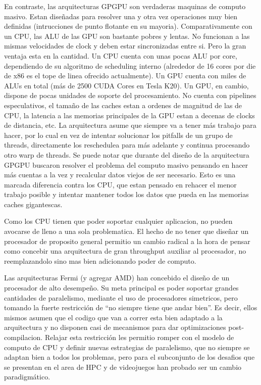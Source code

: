 En contraste, las arquitecturas GPGPU son verdaderas maquinas de computo masivo. Estan dise\~nadas para
resolver una y otra vez operaciones muy bien definidas (intrucciones de punto flotante en su mayoria).
Comparativamente con un CPU, las ALU de las GPU son bastante pobres y lentas. No funcionan a las mismas
velocidades de clock y deben estar sincronizadas entre si. Pero la gran ventaja esta en la cantidad.
Un CPU cuenta con unas pocas ALU por core, dependiendo de su algoritmo de scheduling interno
(alrededor de 16 cores por die de x86 es el tope de linea ofrecido actualmente). Un GPU cuenta con miles de ALUs en total
(m\'as de 2500 CUDA Cores en Tesla K20). Un GPU, en cambio, dispone de pocas unidades de soporte del procesamiento.
No cuenta con pipelines especulativos, el tama\~no de las caches
estan a ordenes de magnitud de las de CPU, la latencia a las memorias principales de la GPU estan a
decenas de clocks de distancia, etc. La arquitectura asume que siempre va a tener m\'as trabajo
para hacer, por lo cual en vez de intentar solucionar los pitfalls de un grupo de threads, directamente
los reschedulea para m\'as adelante y continua procesando otro warp de threads. Se puede notar que durante del
dise\~no de la arquitectura GPGPU buscaron resolver el problema del computo masivo pensando en hacer
m\'as cuentas a la vez y recalcular datos viejos de ser necesario. Esto es una marcada diferencia contra
los CPU, que estan pensado en rehacer el menor trabajo posible y intentar mantener todos los datos que pueda en
las memorias caches gigantescas.

Como los CPU tienen que poder soportar cualquier aplicacion, no pueden avocarse de lleno a una sola
problematica. El hecho de no tener que dise\~nar un procesador de proposito general permitio un cambio radical
a la hora de pensar como concebir una arquitectura de gran throughput auxiliar al procesador, no reemplazandolo
sino mas bien adicionando poder de computo.~\cite{GlaskowskyFermi}

Las arquitecturas Fermi (y agregar AMD) han concebido el dise\~no de un procesador de alto desempe\~no.
Su meta principal es poder soportar grandes cantidades de paralelismo, mediante el uso de procesadores
simetricos, pero tomando la fuerte restricci\'on de ``no siempre tiene que andar bien''. Es decir, ellos
mismos asumen que el codigo que van a correr esta bien adaptado a la arquitectura y no disponen
casi de mecanismos para dar optimizaciones post-compilacion. Relajar esta restricci\'on
les permitio romper con el modelo de computo de CPU y definir nuevas estrategias de paralelismo,
que no siempre se adaptan bien a todos los problemas, pero para el subconjunto de los desafios que se
presentan en el area de HPC y de videojuegos han probado ser un cambio paradigm\'atico.

